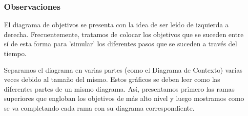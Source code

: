 \subsubsection{Observaciones}

El diagrama de objetivos se presenta con la idea de ser leído de izquierda a derecha. Frecuentemente, tratamos de colocar los objetivos que se suceden entre sí de esta forma para 'simular' los diferentes pasos que se suceden a través del tiempo.

Separamos el diagrama en varias partes (como el Diagrama de Contexto) varias veces debido al tamaño del mismo. Estos gráficos se deben leer como las diferentes partes de un mismo diagrama. Asi, presentamos primero las ramas superiores que engloban los objetivos de más alto nivel y luego mostramos como se va completando cada rama con su diagrama correspondiente.
